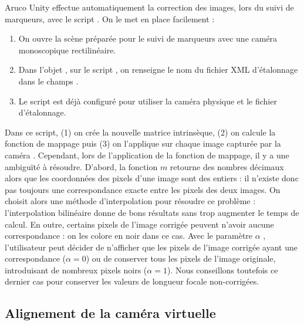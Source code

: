Aruco Unity effectue automatiquement la correction des images, lors du suivi de marqueurs, avec le script . On le met en place facilement  :
\begin{enumerate}
  \item On ouvre la scène  préparée pour le suivi de marqueurs avec une caméra monoscopique rectilinéaire.
  \item Dans l'objet , sur le script , on renseigne le nom du fichier XML d'étalonnage dans le champs .
  \item Le script  est déjà configuré pour utiliser la caméra physique et le fichier d'étalonnage.
\end{enumerate}

Dans ce script, (1) on crée la nouvelle matrice intrinsèque, (2) on calcule la fonction de mappage puis (3) on l'applique sur chaque image capturée par la caméra . Cependant, lors de l'application de la fonction de mappage, il y a une ambiguïté à résoudre. D'abord, la fonction $m$ retourne des nombres décimaux alors que les coordonnées des pixels d'une image sont des entiers : il n'existe donc pas toujours une correspondance exacte entre les pixels des deux images. On choisit alors une méthode d'interpolation pour résoudre ce problème : l'interpolation bilinéaire donne de bons résultats sans trop augmenter le temps de calcul. En outre, certains pixels de l'image corrigée peuvent n'avoir aucune correspondance : on les colore en noir dans ce cas. Avec le paramètre $\alpha$ , l'utilisateur peut décider de n'afficher que les pixels de l'image corrigée ayant une correspondance ($\alpha = 0$) ou de conserver tous les pixels de l'image originale, introduisant de nombreux pixels noirs ($\alpha = 1$). Nous conseillons toutefois ce dernier cas pour conserver les valeurs de longueur focale non-corrigées.


\subsection{Alignement de la caméra virtuelle}
\label{subsec:pinhole_camera_display}

